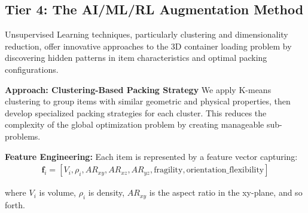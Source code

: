 \documentclass{article}
\begin{document}
\subsection{Tier 4: The AI/ML/RL Augmentation Method}

Unsupervised Learning techniques, particularly clustering and dimensionality reduction, offer innovative approaches to the 3D container loading problem by discovering hidden patterns in item characteristics and optimal packing configurations.

\textbf{Approach: Clustering-Based Packing Strategy}
We apply K-means clustering to group items with similar geometric and physical properties, then develop specialized packing strategies for each cluster. This reduces the complexity of the global optimization problem by creating manageable sub-problems.

\textbf{Feature Engineering:}
Each item is represented by a feature vector capturing:
\begin{align}
\mathbf{f}_i = [V_i, \rho_i, AR_{xy}, AR_{xz}, AR_{yz}, \text{fragility}, \text{orientation\_flexibility}]
\end{align}

where $V_i$ is volume, $\rho_i$ is density, $AR_{xy}$ is the aspect ratio in the xy-plane, and so forth.
\end{document}
